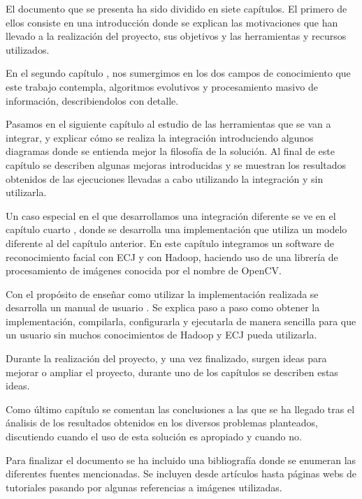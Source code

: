 El documento que se presenta ha sido dividido en siete cap\'itulos. El primero de ellos consiste en una introducci\'on  donde se explican las motivaciones que han llevado a la realizaci\'on del proyecto, sus objetivos y las herramientas y recursos utilizados.

En el segundo cap\'itulo , nos sumergimos en los dos campos de conocimiento que este trabajo contempla, algoritmos evolutivos y procesamiento masivo de informaci\'on, describiendolos con detalle.

Pasamos en el siguiente cap\'itulo  al estudio de las herramientas que se van a integrar, y explicar c\'omo se realiza la integraci\'on introduciendo algunos diagramas donde se entienda mejor la filosofía de la solución. Al final de este cap\'itulo se describen algunas mejoras introducidas y se muestran los resultados obtenidos de las ejecuciones llevadas a cabo utilizando la integraci\'on y sin utilizarla.

Un caso especial en el que desarrollamos una integraci\'on diferente se ve en el cap\'itulo cuarto , donde se desarrolla una implementaci\'on que utiliza un modelo diferente al del cap\'itulo anterior. En este cap\'itulo integramos un software de reconocimiento facial con ECJ y con Hadoop, haciendo uso de una librer\'ia de procesamiento de im\'agenes conocida por el nombre de OpenCV.

Con el prop\'osito de ense\~nar como utilizar la implementaci\'on realizada se desarrolla un manual de usuario . Se explica paso a paso como obtener la implementaci\'on, compilarla, configurarla y ejecutarla de manera sencilla para que un usuario sin muchos conocimientos de Hadoop y ECJ pueda utilizarla.

Durante la realizaci\'on del proyecto, y una vez finalizado, surgen ideas para mejorar o ampliar el proyecto,  durante uno de los cap\'itulos  se describen estas ideas.

Como \'ultimo cap\'itulo  se comentan las conclusiones a las que se ha llegado tras el \'analisis de los resultados obtenidos en los diversos problemas planteados, discutiendo cuando el uso de esta soluci\'on es apropiado y cuando no.

Para finalizar el documento se ha incluido una bibliografía donde se enumeran las diferentes fuentes mencionadas. Se incluyen desde art\'iculos hasta p\'aginas webs de tutoriales pasando por algunas referencias a im\'agenes utilizadas.